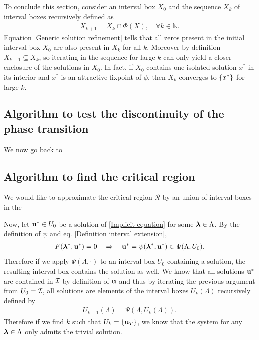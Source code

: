 \documentclass[
11pt, %
english, %
singlespacing, %
nolistspacing, %
liststotoc, %
headsepline, %
]{MastersDoctoralThesis} %
\begin{document}
To conclude this section, consider an interval box $X_0$ and the sequence $X_k$ of interval boxes recursively defined as
\begin{align}
	X_{k+1} = X_k \cap \Phi(X), \quad \forall k \in \mathbb{N}. \label{Generic refinement iteration}
\end{align}
Equation \eqref{Generic solution refinement} tells that all zeros present in the initial interval box $X_0$ are also present in $X_k$ for all $k$. Moreover by definition $X_{k+1} \subseteq X_k$, so iterating in the sequence for large $k$ can only yield a closer enclosure of the solutions in $X_0$. In fact, if $X_0$ contains one isolated solution $x^*$ in its interior and $x^*$ is an attractive fixpoint of $\phi$, then $X_k$ converges to $\{x^*\}$ for large $k$.

\subsection{Algorithm to test the discontinuity of the phase transition}

We now go back to

\subsection{Algorithm to find the critical region}

We would like to approximate the critical region $\mathcal{R}$ by an union of interval boxes in the 

Now, let $\boldsymbol{\mathrm{u}}^* \in U_0$ be a solution of \eqref{Implicit equation} for some $\boldsymbol{\mathrm{\lambda}} \in \Lambda$. By the definition of $\psi$ and eq. \eqref{Definition interval extension},
\begin{align}
	F(\boldsymbol{\mathrm{\lambda}}^*, \boldsymbol{\mathrm{u}}^*) = 0 \quad \Rightarrow \quad \boldsymbol{\mathrm{u}}^* = \psi(\boldsymbol{\mathrm{\lambda}}^*, \boldsymbol{\mathrm{u}}^*) \in \Psi(\Lambda, U_0).
\end{align}
Therefore if we apply $\Psi(\Lambda, \cdot)$ to an interval box $U_0$ containing a solution, the resulting interval box contains the solution as well. We know that all solutions $\boldsymbol{\mathrm{u}}^*$ are contained in $\mathcal{I}$ by definition of $\boldsymbol{\mathrm{u}}$ and thus by iterating the previous argument from $U_0 = \mathcal{I}$, all solutions are elements of the interval boxes $U_k(\Lambda)$ recursively defined by
\begin{align}
	U_{k+1}(\Lambda) = \Psi(\Lambda, U_k(\Lambda)). \label{Recursion relation for Uk}
\end{align}
Therefore if we find $k$ such that $U_k = \{\boldsymbol{\mathrm{u}}_T\}$, we know that the system for any $\boldsymbol{\mathrm{\lambda}} \in \Lambda$ only admits the trivial solution.
\end{document}
